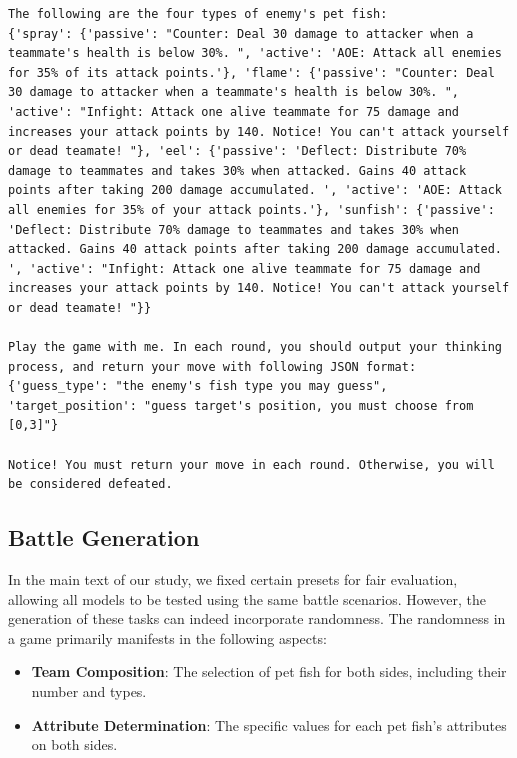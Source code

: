 \begin{lstlisting}
The following are the four types of enemy's pet fish:
{'spray': {'passive': "Counter: Deal 30 damage to attacker when a teammate's health is below 30%. ", 'active': 'AOE: Attack all enemies for 35% of its attack points.'}, 'flame': {'passive': "Counter: Deal 30 damage to attacker when a teammate's health is below 30%. ", 'active': "Infight: Attack one alive teammate for 75 damage and increases your attack points by 140. Notice! You can't attack yourself or dead teamate! "}, 'eel': {'passive': 'Deflect: Distribute 70% damage to teammates and takes 30% when attacked. Gains 40 attack points after taking 200 damage accumulated. ', 'active': 'AOE: Attack all enemies for 35% of your attack points.'}, 'sunfish': {'passive': 'Deflect: Distribute 70% damage to teammates and takes 30% when attacked. Gains 40 attack points after taking 200 damage accumulated. ', 'active': "Infight: Attack one alive teammate for 75 damage and increases your attack points by 140. Notice! You can't attack yourself or dead teamate! "}}

Play the game with me. In each round, you should output your thinking process, and return your move with following JSON format:
{'guess_type': "the enemy's fish type you may guess", 'target_position': "guess target's position, you must choose from [0,3]"}

Notice! You must return your move in each round. Otherwise, you will be considered defeated.
\end{lstlisting}


\subsection{Battle Generation}


In the main text of our study, we fixed certain presets for fair evaluation, allowing all models to be tested using the same battle scenarios. However, the generation of these tasks can indeed incorporate randomness. The randomness in a game primarily manifests in the following aspects:



\begin{itemize}
    \item \textbf{Team Composition}: The selection of pet fish for both sides, including their number and types.
    \item \textbf{Attribute Determination}: The specific values for each pet fish’s attributes on both sides.
\end{itemize}

